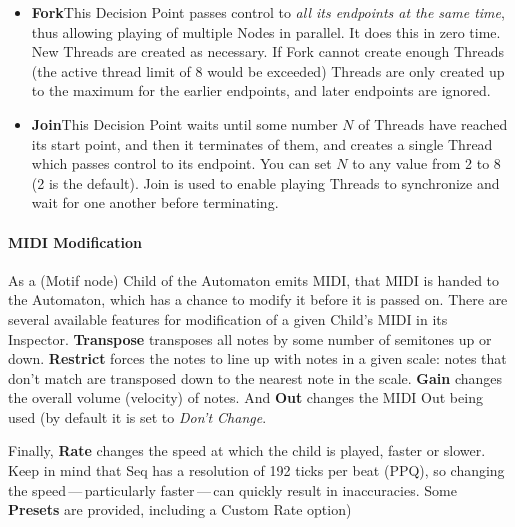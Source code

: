 \documentclass[twoside,10pt]{article}
\begin{document}
\begin{itemize}
\item{\bf Fork}\quad This Decision Point passes control to {\it all its endpoints at the same time}, thus allowing playing of multiple Nodes in parallel.  It does this in zero time.  New Threads are created as necessary.  If Fork cannot create enough Threads (the active thread limit of 8 would be exceeded) Threads are only created up to the maximum for the earlier endpoints, and later endpoints are ignored.

\item{\bf Join}\quad This Decision Point waits until some number \(N\) of Threads have reached its start point, and then it terminates of them, and creates a single Thread which passes control to its endpoint.  You can set \(N\) to any value from 2 to 8 (2 is the default).  Join is used to enable playing Threads to synchronize and wait for one another before terminating.  

\end{itemize}

\paragraph{MIDI Modification}

As a (Motif node) Child of the Automaton emits MIDI, that MIDI is handed to the Automaton, which has a chance to modify it before it is passed on.  There are several available features for modification of a given Child's MIDI in its Inspector.  {\bf Transpose} transposes all notes by some number of semitones up or down.  {\bf Restrict} forces the notes to line up with notes in a given scale: notes that don't match are transposed down to the nearest note in the scale.  {\bf Gain} changes the overall volume (velocity) of notes.  And {\bf Out} changes the MIDI Out being used (by default it is set to {\it Don't Change}.

Finally, {\bf Rate} changes the speed at which the child is played, faster or slower.  Keep in mind that Seq has a resolution of 192 ticks per beat (PPQ), so changing the speed\,---\,particularly faster\,---\,can quickly result in inaccuracies.    Some {\bf Presets} are provided, including a Custom Rate option)

\clearpage
\end{document}
